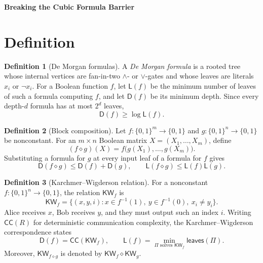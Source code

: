 \documentclass[10pt,a4paper]{article}
\theoremstyle{definition}
\newtheorem{definition}{Definition}
\theoremstyle{plain}
\theoremstyle{definition}
\newcommand{\KW}{\mathsf{KW}}
\newcommand{\CC}{\mathsf{CC}}
\newcommand{\Depth}{\mathsf{D}}
\newcommand{\Size}{\mathsf{L}}
\newcommand{\Leaves}{\mathsf{leaves}}
\begin{document}
\begin{center}
  {\Large\bfseries Breaking the Cubic Formula Barrier}
\end{center}
\section{Definition}
\begin{definition}[De Morgan formulas]
A \emph{De Morgan formula} is a rooted tree whose internal vertices are fan-in-two
$\wedge$- or $\vee$-gates and whose leaves are literals $x_i$ or $\neg x_i$.
For a Boolean function $f$, let $\Size(f)$ be the minimum number of leaves of such a
formula computing $f$, and let $\Depth(f)$ be its minimum depth. Since every depth-$d$
formula has at most $2^d$ leaves,
\begin{equation}\label{eq:size-depth}
  \Depth(f)\geq \log \Size(f).
\end{equation}
\end{definition}

\begin{definition}[Block composition]
Let $f:\{0,1\}^{m}\to\{0,1\}$ and $g:\{0,1\}^{n}\to\{0,1\}$ be nonconstant.
For an $m\times n$ Boolean matrix $X=(X_1,\ldots,X_m)$, define
\begin{equation}\label{eq:composition}
  (f\diamond g)(X)=f\bigl(g(X_1),\ldots,g(X_m)\bigr).
\end{equation}
Substituting a formula for $g$ at every input leaf of a formula for $f$ gives
\begin{equation}\label{eq:easy-upper}
  \Depth(f\diamond g)\leq \Depth(f)+\Depth(g),
  \qquad
  \Size(f\diamond g)\leq \Size(f)\Size(g).
\end{equation}
\end{definition}

\begin{definition}[Karchmer--Wigderson relation]
For a nonconstant $f:\{0,1\}^{n}\to\{0,1\}$, the relation $\KW_f$ is
\begin{equation}\label{eq:kw-relation}
  \KW_f=\{(x,y,i):x\in f^{-1}(1),\ y\in f^{-1}(0),\ x_i\neq y_i\}.
\end{equation}
Alice receives $x$, Bob receives $y$, and they must output such an index $i$.
Writing $\CC(R)$ for deterministic communication complexity, the
Karchmer--Wigderson correspondence states
\begin{equation}\label{eq:kw-correspondence}
  \Depth(f)=\CC(\KW_f),
  \qquad
  \Size(f)=\min_{\Pi\text{ solves }\KW_f}\Leaves(\Pi).
\end{equation}
Moreover, $\KW_{f\diamond g}$ is denoted by $\KW_f\diamond\KW_g$.
\end{definition}
\end{document}
